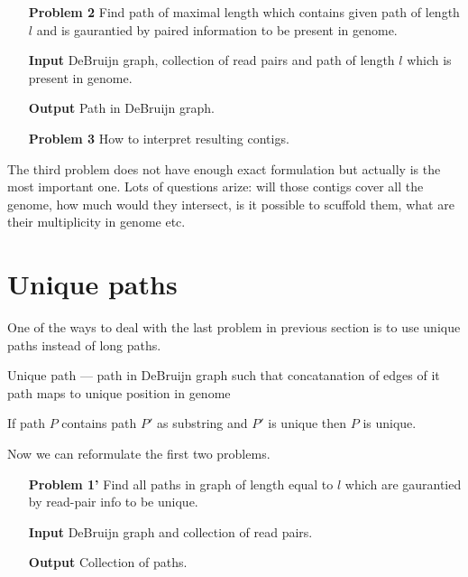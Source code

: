 \documentclass[a4paper,10pt]{article}
\begin{document}
\smallskip

\begin{itemize}
\item[\bf Problem 2] Find path of maximal length which contains given path of length $l$ and is gaurantied by paired information to be present in genome.
\item[\bf Input] DeBruijn graph, collection of read pairs and path of length $l$ which is present in genome.
\item[\bf Output] Path in DeBruijn graph.
\end{itemize}

\smallskip
\begin{itemize}
\item[\bf Problem 3] How to interpret resulting contigs.
\end{itemize}

The third problem does not have enough exact formulation but actually is the most important one. Lots of questions arize: will those contigs cover all the genome, how much would they intersect, is it possible to scuffold them, what are their multiplicity in genome etc.

\section{Unique paths}
One of the ways to deal with the last problem in previous section is to use unique paths instead of long paths.

\begin{defin}
Unique path --- path in DeBruijn graph such that concatanation of edges of it path maps to unique position in genome
\end{defin}

\begin{prop}
If path $P$ contains path $P'$ as substring and $P'$ is unique then $P$ is unique.
\end{prop}

Now we can reformulate the first two problems.

\begin{itemize}
\item[\bf Problem 1'] Find all paths in graph of length equal to $l$ which are gaurantied by read-pair info to be unique.
\item[\bf Input] DeBruijn graph and collection of read pairs.
\item[\bf Output] Collection of paths.
\end{itemize}
\end{document}
